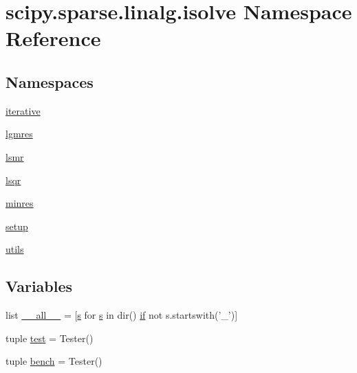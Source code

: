 \hypertarget{namespacescipy_1_1sparse_1_1linalg_1_1isolve}{}\section{scipy.\+sparse.\+linalg.\+isolve Namespace Reference}
\label{namespacescipy_1_1sparse_1_1linalg_1_1isolve}
\subsection*{Namespaces}
\begin{DoxyCompactItemize}
\item 
 \hyperlink{namespacescipy_1_1sparse_1_1linalg_1_1isolve_1_1iterative}{iterative}
\item 
 \hyperlink{namespacescipy_1_1sparse_1_1linalg_1_1isolve_1_1lgmres}{lgmres}
\item 
 \hyperlink{namespacescipy_1_1sparse_1_1linalg_1_1isolve_1_1lsmr}{lsmr}
\item 
 \hyperlink{namespacescipy_1_1sparse_1_1linalg_1_1isolve_1_1lsqr}{lsqr}
\item 
 \hyperlink{namespacescipy_1_1sparse_1_1linalg_1_1isolve_1_1minres}{minres}
\item 
 \hyperlink{namespacescipy_1_1sparse_1_1linalg_1_1isolve_1_1setup}{setup}
\item 
 \hyperlink{namespacescipy_1_1sparse_1_1linalg_1_1isolve_1_1utils}{utils}
\end{DoxyCompactItemize}
\subsection*{Variables}
\begin{DoxyCompactItemize}
\item 
list \hyperlink{namespacescipy_1_1sparse_1_1linalg_1_1isolve_a1cd138cd71c60fbb3413daa461d33556}{\+\_\+\+\_\+all\+\_\+\+\_\+} = \mbox{[}\hyperlink{indexexpr_8h_ae024b0db549122b44c349ae28ec990dc}{s} for \hyperlink{indexexpr_8h_ae024b0db549122b44c349ae28ec990dc}{s} in dir() \hyperlink{minmax_8h_a30a0ee9fee303f01d9c5e6f669e0dfe9}{if} not s.\+startswith('\+\_\+')\mbox{]}
\item 
tuple \hyperlink{namespacescipy_1_1sparse_1_1linalg_1_1isolve_a2a4b2169cb9c00deb13f9ac56610c514}{test} = Tester()
\item 
tuple \hyperlink{namespacescipy_1_1sparse_1_1linalg_1_1isolve_add33126c2d7e05af5c9a948cb79a320e}{bench} = Tester()
\end{DoxyCompactItemize}


